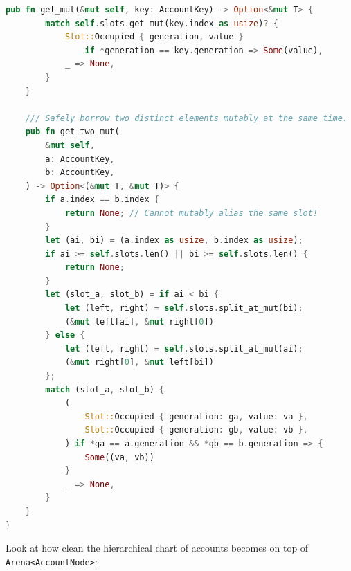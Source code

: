 \begin{lstlisting}[language=Rust]
    pub fn get_mut(&mut self, key: AccountKey) -> Option<&mut T> {
        match self.slots.get_mut(key.index as usize)? {
            Slot::Occupied { generation, value }
                if *generation == key.generation => Some(value),
            _ => None,
        }
    }

    /// Safely borrow two distinct elements mutably at the same time.
    pub fn get_two_mut(
        &mut self,
        a: AccountKey,
        b: AccountKey,
    ) -> Option<(&mut T, &mut T)> {
        if a.index == b.index {
            return None; // Cannot mutably alias the same slot!
        }
        let (ai, bi) = (a.index as usize, b.index as usize);
        if ai >= self.slots.len() || bi >= self.slots.len() {
            return None;
        }
        let (slot_a, slot_b) = if ai < bi {
            let (left, right) = self.slots.split_at_mut(bi);
            (&mut left[ai], &mut right[0])
        } else {
            let (left, right) = self.slots.split_at_mut(ai);
            (&mut right[0], &mut left[bi])
        };
        match (slot_a, slot_b) {
            (
                Slot::Occupied { generation: ga, value: va },
                Slot::Occupied { generation: gb, value: vb },
            ) if *ga == a.generation && *gb == b.generation => {
                Some((va, vb))
            }
            _ => None,
        }
    }
}
\end{lstlisting}

Look at how clean the hierarchical chart of accounts becomes on top of \texttt{Arena<AccountNode>}:

